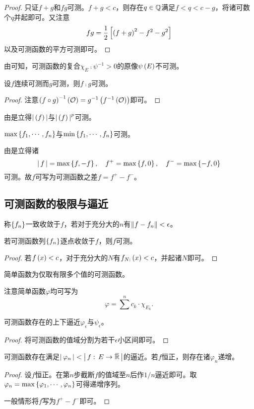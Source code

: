 \documentclass{ctexrep}
\begin{document}
  \begin{proof}
    只证$f+g$和$fg$可测。$f+g<c$，则存在$q\in\mathbb{Q}$满足$f<q<c-g$，将诸可数个$q$并起即可。又注意
    \[ fg=\frac{1}{2}\left[\left(f+g\right)^2-f^2-g^2\right] \]
    以及可测函数的平方可测即可。
  \end{proof}
  \begin{ex}
    由可知，可测函数的复合$\chi_E\comp\psi^{-1}>0$的原像$\psi\left(E\right)$不可测。
  \end{ex}
  \begin{theorem}
    设$f$连续可测而$g$可测，则$f\comp g$可测。
  \end{theorem}
  \begin{proof}
    注意$\left(f\circ g\right)^{-1}\left(\mathcal{O}\right) = g^{-1}\left(f^{-1}\left(\mathcal{O}\right)\right)$即可。
  \end{proof}
  由是立得$\left|\, \left(f\right) \,\right|$与$\left|\, \left(f\right) \,\right|^p$可测。
  \begin{proposition}
    $\text{max}\left\{f_1,\cdots,f_n\right\}$与$\text{min}\left\{f_1,\cdots,f_n\right\}$可测。
  \end{proposition}
  由是立得诸
  \[ \left|\, f \,\right| = \text{max}\left\{f,-f\right\},\quad f^+=\text{max}\left\{f,0\right\},\quad f^-=\text{max}\left\{-f,0\right\} \]
  可测。故$f$可写为可测函数之差$f=f^+-f^-$。
  \subsection{可测函数的极限与逼近}
  \begin{definition}
    称$\left\{f_n\right\}$一致收敛于$f$，若对于充分大的$n$有$\left\| f-f_n \right\|<\epsilon$。
  \end{definition}
  \begin{proposition}
    若可测函数列$\left\{f_n\right\}$逐点收敛于$f$，则$f$可测。
  \end{proposition}
  \begin{proof}
    若$f\left(x\right)<c$，对于充分大的$N$有$f_{N:}\left(x\right)<c$，并起诸$N$即可。
  \end{proof}
  \begin{definition}
    简单函数为仅取有限多个值的可测函数。
  \end{definition}
  注意简单函数$\varphi$均可写为
  \[ \varphi = \sum^n c_k\cdot \chi_{E_k}. \]
  \begin{lemma}[简单函数逼近]
    可测函数存在\epsclo 的上下逼近$\varphi_\epsilon$与$\psi_\epsilon$。
  \end{lemma}
  \begin{proof}
    将可测函数的值域分割为若干$\epsilon$小区间即可。
  \end{proof}
  \begin{theorem}[简单函数逼近]
    可测函数存在满足$\abs{\varphi_n}<\abs{\func{f}{E}{\clo{\R}}}$的逼近。若$f$恒正，则存在诸$\varphi_n$递增。
  \end{theorem}
  \begin{proof}
    设$f$恒正。在第$n$步截断$f$的值域至$n$后作$1/n$逼近即可。取$\varphi_n=\text{max}\left\{\varphi_1,\cdots,\varphi_n\right\}$可得递增序列。
    \par
    一般情形将$f$写为$f^+-f^-$即可。
  \end{proof}
\end{document}

